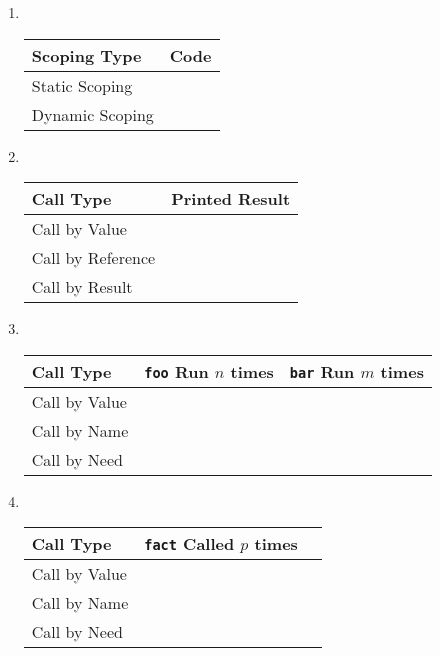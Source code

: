 \documentclass[10pt]{article}
\begin{document}
\begin{enumerate}
  \item \ 
    \begin{tabular}{|l|c|}
      \hline
      Scoping Type    & Code \\ \hline
      Static Scoping  & \\ \hline
      Dynamic Scoping & \\ \hline
    \end{tabular}
  \item \ 
    \begin{tabular}{|l|c|}
      \hline
      Call Type         & Printed Result \\ \hline
      Call by Value     & \\ \hline
      Call by Reference & \\ \hline
      Call by Result    & \\ \hline
    \end{tabular}
  \item \ 
    \begin{tabular}{|l|c|c|}
      \hline
      Call Type     & \texttt{foo} Run $n$ times & \texttt{bar} Run $m$ times\\ \hline
      Call by Value & & \\ \hline
      Call by Name  & & \\ \hline
      Call by Need  & & \\ \hline
    \end{tabular}
  \item \ 
    \begin{tabular}{|l|c|c|}
      \hline
      Call Type     & \texttt{fact} Called $p$ times \\ \hline
      Call by Value & \\ \hline
      Call by Name  & \\ \hline
      Call by Need  & \\ \hline
    \end{tabular}
\end{enumerate}
\end{document}

